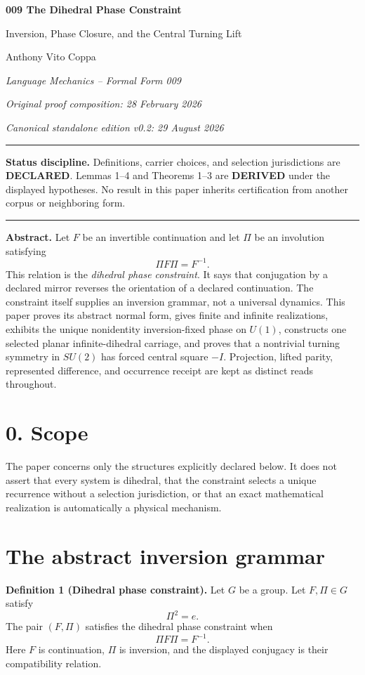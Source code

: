 \documentclass[11pt]{article}
\newenvironment{statusbox}{\begin{center}\begin{minipage}{0.94\textwidth}\small\hrule\vspace{0.45em}}{\vspace{0.45em}\hrule\end{minipage}\end{center}}
\begin{document}
\begin{center}
{\Large\bfseries 009 The Dihedral Phase Constraint}\par
\vspace{0.18em}
{\large Inversion, Phase Closure, and the Central Turning Lift}\par
\vspace{0.5em}
Anthony Vito Coppa\par
\textit{Language Mechanics -- Formal Form 009}\par
\textit{Original proof composition: 28 February 2026}\par
\textit{Canonical standalone edition v0.2: 29 August 2026}
\end{center}

\begin{statusbox}
\textbf{Status discipline.} Definitions, carrier choices, and selection jurisdictions are \textbf{DECLARED}. Lemmas 1--4 and Theorems 1--3 are \textbf{DERIVED} under the displayed hypotheses. No result in this paper inherits certification from another corpus or neighboring form.
\end{statusbox}

\textbf{Abstract.}
Let $F$ be an invertible continuation and let $\Pi$ be an involution satisfying
\[
\Pi F\Pi=F^{-1}.
\]
This relation is the \emph{dihedral phase constraint}. It says that conjugation by a declared mirror reverses the orientation of a declared continuation. The constraint itself supplies an inversion grammar, not a universal dynamics. This paper proves its abstract normal form, gives finite and infinite realizations, exhibits the unique nonidentity inversion-fixed phase on $U(1)$, constructs one selected planar infinite-dihedral carriage, and proves that a nontrivial turning symmetry in $SU(2)$ has forced central square $-I$. Projection, lifted parity, represented difference, and occurrence receipt are kept as distinct reads throughout.

\section*{0. Scope}
The paper concerns only the structures explicitly declared below. It does not assert that every system is dihedral, that the constraint selects a unique recurrence without a selection jurisdiction, or that an exact mathematical realization is automatically a physical mechanism.

\section{The abstract inversion grammar}
\textbf{Definition 1 (Dihedral phase constraint).}
Let $G$ be a group. Let $F,\Pi\in G$ satisfy
\[
\Pi^2=e.
\]
The pair $(F,\Pi)$ satisfies the dihedral phase constraint when
\[
\boxed{\Pi F\Pi=F^{-1}.}
\]
Here $F$ is continuation, $\Pi$ is inversion, and the displayed conjugacy is their compatibility relation.
\end{document}
